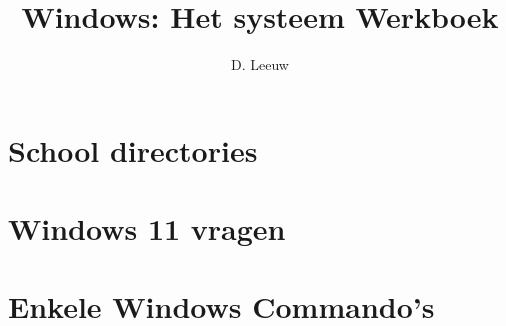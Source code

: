 \documentclass[a4paper,12pt,twoside,titlepage]{article}
\author{D. Leeuw}
\title{Windows: Het systeem Werkboek}
\date{\today\\
0.0.0
\vfill
\raggedright
\copyright\ 2025 Dennis Leeuw\\
}
\begin{document}

\maketitle



\section{School directories}


\section{Windows 11 vragen}


\section{Enkele Windows Commando's}


\printindex
\end{document}

